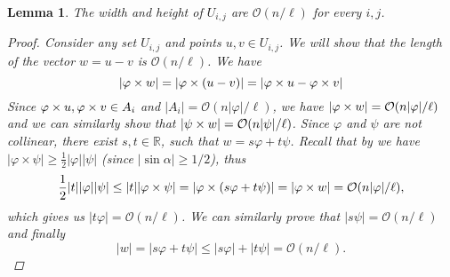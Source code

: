 \documentclass[11pt]{article}
\renewcommand{\O}{\mathcal{O}}
\renewcommand{\phi}{\varphi}
\theoremstyle{plain}
\newtheorem{lemma}{Lemma}
\theoremstyle{definition}
\theoremstyle{remark}
\begin{document}
\begin{lemma}
	The width and height of $U_{i, j}$ are $\O(n / \ell)$ for every $i, j$.
	\begin{proof}
		Consider any set $U_{i, j}$ and points $u, v \in U_{i, j}$.
		We will show that the length of the vector $w = u - v$ is $\O(n / \ell)$.
		We have
		$$ |\h{w}| = |\h{(u - v)}| = |\h{u} - \h{v}| $$
		Since $\h{u}, \h{v} \in A_i$ and $|A_i| = \O(n|\phi| / \ell)$, we have $|\h{w}| = \O(n|\phi| / \ell)$ and we can similarly show that $|\s{w}| = \O(n|\psi| / \ell)$.
		Since $\phi$ and $\psi$ are not collinear, there exist $s, t \in \mathbb{R}$, such that $w = s\phi + t\psi$.
		Recall that by  we have $|\phi \times \psi| \ge \frac{1}{2}|\phi||\psi|$ (since $|\sin \alpha| \ge 1/2$), thus
		$$ \frac{1}{2}|t||\phi||\psi| \le |t||\phi \times \psi| = |\phi \times (s\phi + t\psi)| = |\h{w}| = \O(n|\phi| / \ell), $$
		which gives us $|t\phi| = \O(n / \ell)$.
		We can similarly prove that $|s\psi| = \O(n / \ell)$ and finally
		$$ |w| = |s\phi + t\psi| \le |s\phi| + |t\psi| = \O(n / \ell). $$
	\end{proof}
\end{lemma}




\end{document}
